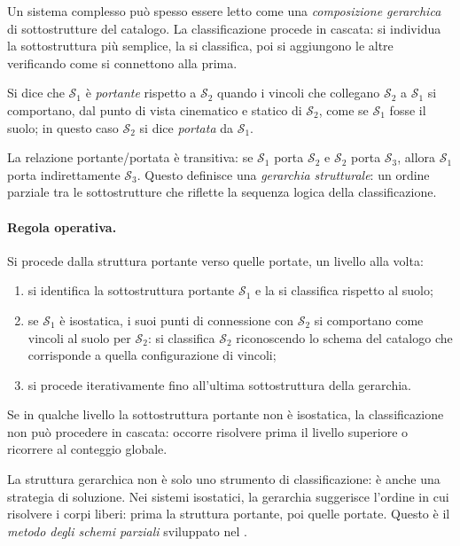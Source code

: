 Un sistema complesso può spesso essere letto come una
\emph{composizione gerarchica} di sottostrutture del catalogo.
La classificazione procede in cascata: si individua la
sottostruttura più semplice, la si classifica, poi si
aggiungono le altre verificando come si connettono alla prima.

Si dice che $\mathcal{S}_1$ è
\emph{portante} rispetto a $\mathcal{S}_2$
quando i vincoli che collegano $\mathcal{S}_2$ a $\mathcal{S}_1$ si comportano,
dal punto di vista cinematico e statico di $\mathcal{S}_2$, come se
$\mathcal{S}_1$ fosse il suolo; in questo caso $\mathcal{S}_2$ si dice
\emph{portata} da $\mathcal{S}_1$.

La relazione portante/portata è transitiva: se $\mathcal{S}_1$
porta $\mathcal{S}_2$ e $\mathcal{S}_2$ porta $\mathcal{S}_3$,
allora $\mathcal{S}_1$ porta indirettamente $\mathcal{S}_3$.
Questo definisce una \emph{gerarchia strutturale}: un ordine
parziale tra le sottostrutture che riflette la sequenza
logica della classificazione.

\paragraph{Regola operativa.}
Si procede dalla struttura portante verso quelle portate,
un livello alla volta:
\begin{enumerate}[label=(\arabic*), nosep]
	\item si identifica la sottostruttura portante
	$\mathcal{S}_1$ e la si classifica rispetto al suolo;
	\item se $\mathcal{S}_1$ è isostatica, i suoi punti
	di connessione con $\mathcal{S}_2$ si comportano come
	vincoli al suolo per $\mathcal{S}_2$: si classifica
	$\mathcal{S}_2$ riconoscendo lo schema del catalogo
	che corrisponde a quella configurazione di vincoli;
	\item si procede iterativamente fino all'ultima
	sottostruttura della gerarchia.
\end{enumerate}
Se in qualche livello la sottostruttura portante non è
isostatica, la classificazione non può procedere in cascata:
occorre risolvere prima il livello superiore o ricorrere
al conteggio globale.

\begin{oss}
	La struttura gerarchica non è solo uno strumento
	di classificazione: è anche una strategia di soluzione.
	Nei sistemi isostatici, la gerarchia suggerisce l'ordine
	in cui risolvere i corpi liberi: prima la struttura
	portante, poi quelle portate. Questo è il
	\emph{metodo degli schemi parziali} sviluppato nel
	.
\end{oss}

